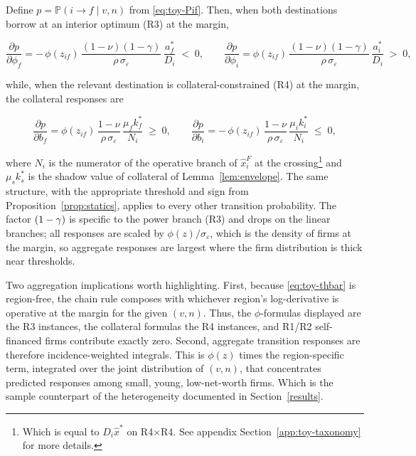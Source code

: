 \documentclass[12pt]{article}
\begin{document}
\begin{proposition}
\label{prop:semielast}
Define $p=\mathbb{P}(i\to f \mid v,n)$ from \eqref{eq:toy-Pif}. Then, when both destinations borrow at an interior optimum (R3) at the margin,

\begin{equation}
  \frac{\partial p}{\partial \phi_{f}}
  = -\,\phi(z_{if})\,
     \frac{(1-\nu)(1-\gamma)}{\rho\,\sigma_{\varepsilon}}\,
     \frac{a^{*}_{f}}{D_{i}} \;<\;0,
  \qquad
  \frac{\partial p}{\partial \phi_{i}}
  = \phi(z_{if})\,
     \frac{(1-\nu)(1-\gamma)}{\rho\,\sigma_{\varepsilon}}\,
     \frac{a^{*}_{i}}{D_{i}} \;>\;0,
  \label{eq:toy-dpdphi}
\end{equation}

while, when the relevant destination is collateral-constrained (R4) at the margin, the collateral responses are

\begin{equation}
  \frac{\partial p}{\partial b_{f}}
  = \phi(z_{if})\,
     \frac{1-\nu}{\rho\,\sigma_{\varepsilon}}\,
     \frac{\mu_{f}k^{*}_{f}}{N_{i}} \;\geq\;0,
  \qquad
  \frac{\partial p}{\partial b_{i}}
  = -\,\phi(z_{if})\,
     \frac{1-\nu}{\rho\,\sigma_{\varepsilon}}\,
     \frac{\mu_{i}k^{*}_{i}}{N_{i}} \;\leq\;0,
  \label{eq:toy-dpdb}
\end{equation}

where $N_{i}$ is the numerator of the operative branch of $\hat x^F_{i}$ at the crossing\footnote{Which is equal to $D_{i}\hat x^{*}$ on R4$\times$R4. See appendix Section~\ref{app:toy-taxonomy} for more details.} and $\mu_{s}k^{*}_{s}$ is the shadow value of collateral of Lemma~\ref{lem:envelope}. The same structure, with the appropriate threshold and sign from Proposition~\ref{prop:statics}, applies to every other transition probability. The factor $(1-\gamma)$ is specific to the power branch (R3) and drops on the linear branches; all responses are scaled by $\phi(z)/\sigma_{\varepsilon}$, which is the density of firms at the margin, so aggregate responses are largest where the firm distribution is thick near thresholds.
\end{proposition}
 
Two aggregation implications worth highlighting. First, because \eqref{eq:toy-thbar} is region-free, the chain rule composes with whichever region's log-derivative is operative at the margin for the given $(v,n)$. Thus, the $\phi$-formulas displayed are the R3 instances, the collateral formulas the R4 instances, and R1/R2 self-financed firms contribute exactly zero. Second, aggregate transition responses are therefore incidence-weighted integrals. This is $\phi(z)$ times the region-specific term, integrated over the joint distribution of $(v,n)$, that concentrates predicted responses among small, young, low-net-worth firms. Which is the sample counterpart of the heterogeneity documented in Section~\ref{results}.
\end{document}
